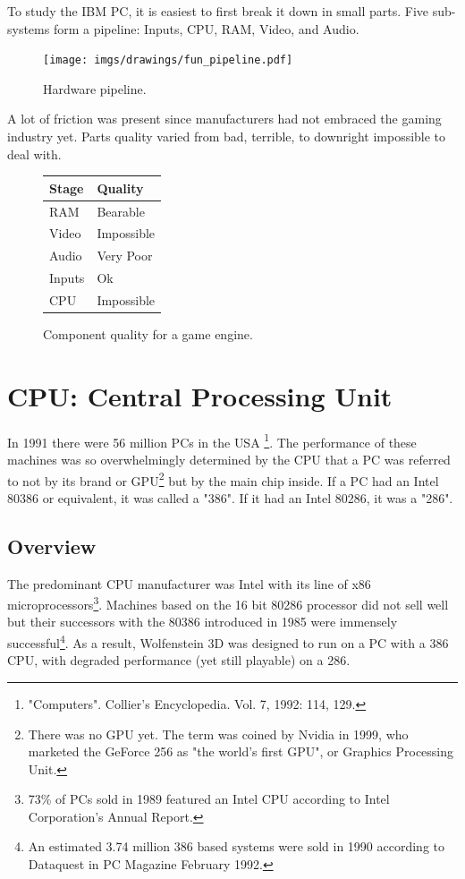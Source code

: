 \documentclass[book.tex]{subfiles}
\begin{document}
\label{chapter_hardware}
To study the IBM PC, it is easiest to first break it down in small parts. Five sub-systems form a pipeline: Inputs, CPU, RAM, Video, and Audio.\\
\begin{figure}[H]
\centering
\texttt{[image: imgs/drawings/fun\_pipeline.pdf]}
\caption{Hardware pipeline.}
\label{fig:digraph}
\end{figure}

A lot of friction was present since manufacturers had not embraced the gaming industry yet. Parts quality varied from  bad, terrible, to downright impossible to deal with.\\
\par

\begin{figure}[H]
\centering
\begin{tabularx}{\textwidth}{ X X  }
  \toprule
  \textbf{Stage} & \textbf{Quality} \\ \bottomrule
  RAM & Bearable \\ 
  Video & Impossible \\ 
  Audio & Very Poor \\ 
  Inputs & Ok \\ 
  CPU & Impossible \\ \bottomrule
\end{tabularx}
\caption{Component quality for a game engine.}
\end{figure}



\section{CPU: Central Processing Unit}
  


  In 1991 there were 56 million PCs in the USA \footnote{"Computers". Collier's Encyclopedia. Vol. 7, 1992: 114, 129.}. The performance of these machines was so overwhelmingly determined by the CPU that a PC was referred to not by its brand or GPU\footnote{There was no GPU yet. The term was coined by Nvidia in 1999, who marketed the GeForce 256 as "the world's first GPU", or Graphics Processing Unit.} but by the main chip inside. If a PC had an Intel 80386 or equivalent, it was called a "386". If it had an Intel 80286, it was a "286".\\
\subsection{Overview}
  The predominant CPU manufacturer was Intel with its line of x86 microprocessors\footnote{73\% of PCs sold in 1989 featured an Intel CPU according to Intel Corporation's Annual Report.}. Machines based on the 16 bit 80286 processor did not sell well but their successors with the 80386 introduced in 1985 were immensely successful\footnote{An estimated 3.74 million 386 based systems were sold in 1990 according to Dataquest in PC Magazine February 1992.}. As a result, Wolfenstein 3D was designed to run on a PC with a 386 CPU, with degraded performance (yet still playable) on a 286.\\
\par
\end{document}
